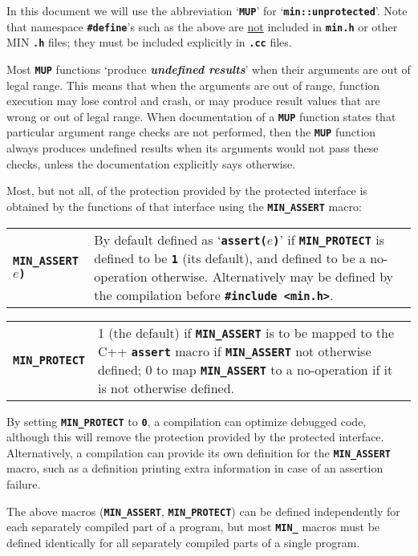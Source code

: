 \documentclass[12pt]{article}
\makeatletter
\newcommand{\TT}[1]{{\tt \bfseries #1}}
\newcommand{\key}[1]{{\bf \em #1}\index{#1}}
\newcommand{\ttkey}[1]{\TT{#1}\index{#1@{\tt #1}}}
\newenvironment{indpar}[1][0.3in]%
	{\begin{list}{}%
		     {\setlength{\itemsep}{0in}%
		      \setlength{\topsep}{0in}%
		      \setlength{\parsep}{1ex}%
		      \setlength{\labelwidth}{#1}%
		      \setlength{\leftmargin}{#1}%
		      \addtolength{\leftmargin}{\labelsep}}%
	 \item}%
	{\end{list}}
\newcommand{\LABEL}[1]{\label{#1}}
\newcommand{\TTNBKEY}[1]{\ttkey{#1}}
\makeatother
\begin{document}
In this document we will use the abbreviation `\TT{MUP}' for
`\TT{min::unprotected}'.
Note that namespace \TT{\#define}'s such as the above are \underline{not}
included in \TT{min.h} or other MIN \TT{.h} files; they must
be included explicitly in \TT{.cc} files.

Most \TT{MUP} functions `produce \key{undefined results}' when their arguments
are out of legal range.
This means that when the arguments are out of range,
function execution may lose control and crash, or may produce result
values that are wrong or out of legal range.
When documentation of a \TT{MUP} function
states that particular argument range checks are not performed,
then the \TT{MUP} function always produces undefined results when its
arguments would not pass these checks,
unless the documentation explicitly says otherwise.

Most, but not all, of the protection provided by the protected interface
is obtained by the functions of that interface using the
\TT{MIN\_ASSERT} macro:

\begin{indpar}
\begin{tabular}{lp{4.0in}}
\TTNBKEY{MIN\_ASSERT}\TT{(}$e$\TT{)}
	& By default defined as `\TT{assert(}$e$\TT{)}' if
	  \TT{MIN\_PROTECT} is defined to be \TT{1} (its default),
	  and defined to be a no-operation otherwise.  Alternatively
	  may be defined by the compilation before
	  \TT{\#include <min.h>}.
\LABEL{MIN_ASSERT}
\end{tabular}
\end{indpar}
\begin{indpar}
\begin{tabular}{lp{4.0in}}
\TTNBKEY{MIN\_PROTECT}	& 1 (the default)
                          if \TT{MIN\_ASSERT} is to be mapped to
			  the C++ \ttkey{assert} macro if \TT{MIN\_ASSERT}
			  not otherwise defined; 0 to map \TT{MIN\_ASSERT}
			  to a no-operation if it is not otherwise defined.
\LABEL{MIN_PROTECT} \\
\end{tabular}
\end{indpar}

By setting \TT{MIN\_PROTECT} to \TT{0}, a compilation can optimize
debugged code, although this will remove the protection
provided by the protected interface.  Alternatively,
a compilation can provide its own definition for the
\TT{MIN\_ASSERT} macro,
such as a definition printing extra information
in case of an assertion failure.

The above macros (\TT{MIN\_ASSERT}, \TT{MIN\_PROTECT})
can be defined independently for each separately compiled
part of a program, but most \TT{MIN\_} macros must be defined identically
for all separately compiled parts of a single program.
\end{document}
